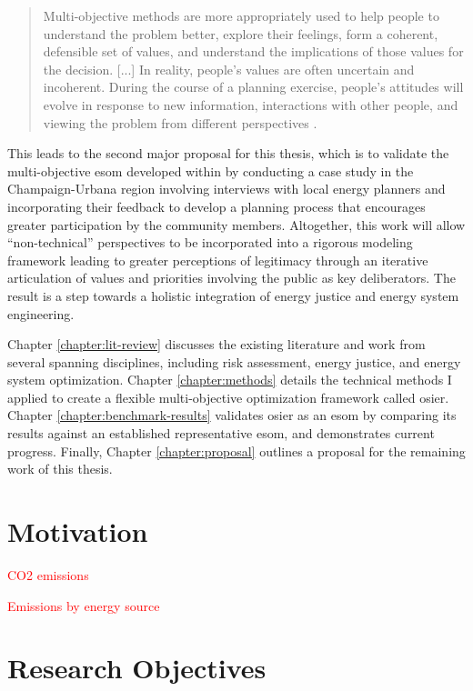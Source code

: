 \begin{quote}
    Multi-objective methods are more appropriately used to help people to
    understand the problem better, explore their feelings, form a coherent,
    defensible set of values, and understand the implications of those values
    for the decision. [...] In reality, people's values are often uncertain and
    incoherent. During the course of a planning exercise, people's attitudes
    will evolve in response to new information, interactions with other people,
    and viewing the problem from different perspectives
    \cite{hobbs_optimization_1995}.    
\end{quote}

This leads to the second major proposal for this thesis, which is to validate
the multi-objective \ac{esom} developed within by conducting a case study in the
Champaign-Urbana region involving interviews with local energy planners and
incorporating their feedback to develop a planning process that encourages
greater participation by the community members. Altogether, this work will allow
``non-technical'' perspectives to be incorporated into a rigorous modeling
framework leading to greater perceptions of legitimacy through an iterative
articulation of values and priorities involving the public as key deliberators.
The result is a step towards a holistic integration of energy justice and energy
system engineering.

Chapter \ref{chapter:lit-review} discusses the existing literature and work from
several spanning disciplines, including risk assessment, energy justice, and
energy system optimization. Chapter \ref{chapter:methods} details the technical
methods I applied to create a flexible multi-objective optimization framework
called \ac{osier}. Chapter \ref{chapter:benchmark-results} validates \ac{osier}
as an \ac{esom} by comparing its results against an established representative
\ac{esom}, and demonstrates current progress. Finally, Chapter
\ref{chapter:proposal} outlines a proposal for the remaining work of this
thesis.

\section{Motivation}

\textcolor{red}{CO2 emissions}

\textcolor{red}{Emissions by energy source}

\section{Research Objectives}


